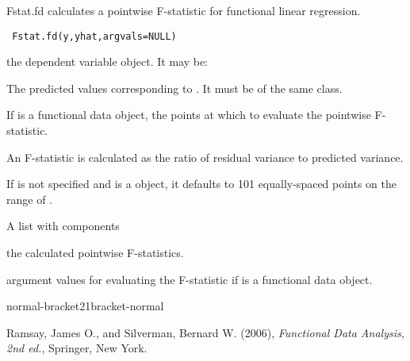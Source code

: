 \documentclass{article}
\begin{document}
\begin{Description}\relax
Fstat.fd calculates a pointwise F-statistic for functional linear regression.
\end{Description}
\begin{Usage}
\begin{verbatim} Fstat.fd(y,yhat,argvals=NULL)\end{verbatim}
\end{Usage}
\begin{Arguments}
\begin{ldescription}
\item[\code{y}] the dependent variable object.  It may be:

\item[\code{yhat}] The predicted values corresponding to . It must be of the same class.

\item[\code{argvals}] If  is a functional data object, the points at which to evaluate
the pointwise F-statistic.

\end{ldescription}
\end{Arguments}
\begin{Details}\relax
An F-statistic is calculated as the ratio of residual variance to predicted
variance.

If  is not specified and  is a  object,
it defaults to 101 equally-spaced points on the range of .
\end{Details}
\begin{Value}
A list with components
\begin{ldescription}
\item[\code{F}] the calculated pointwise F-statistics.
\item[\code{argvals}] argument values for evaluating the F-statistic if  is
a functional data object.

\end{ldescription}

normal-bracket21bracket-normal
\end{Value}
\begin{Source}\relax
Ramsay, James O., and Silverman, Bernard W. (2006), \emph{Functional
Data Analysis, 2nd ed.}, Springer, New York.
\end{Source}
\begin{SeeAlso}\relax
{}
\end{SeeAlso}
\end{document}
